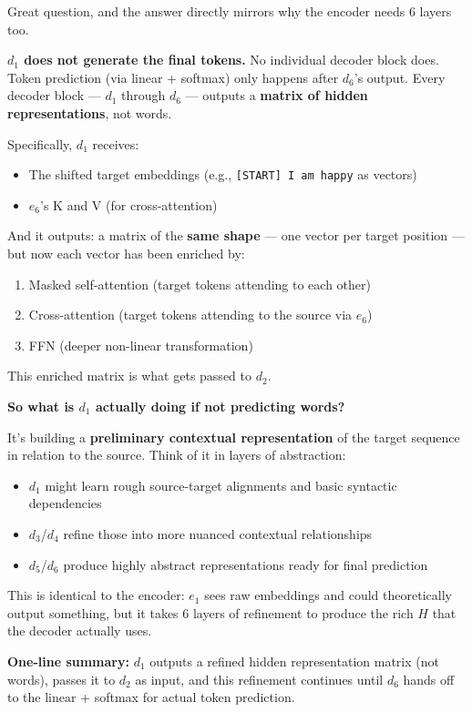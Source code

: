 \medskip

Great question, and the answer directly mirrors why the encoder needs 6 layers too.

\bigskip

\textbf{$d_1$ does not generate the final tokens.} No individual decoder block does. Token prediction (via linear + softmax) only happens after $d_6$'s output. Every decoder block --- $d_1$ through $d_6$ --- outputs a \textbf{matrix of hidden representations}, not words.

Specifically, $d_1$ receives:
\begin{itemize}
    \item The shifted target embeddings (e.g., \texttt{[START] I am happy} as vectors)
    \item $e_6$'s K and V (for cross-attention)
\end{itemize}

And it outputs: a matrix of the \textbf{same shape} --- one vector per target position --- but now each vector has been enriched by:
\begin{enumerate}
    \item Masked self-attention (target tokens attending to each other)
    \item Cross-attention (target tokens attending to the source via $e_6$)
    \item FFN (deeper non-linear transformation)
\end{enumerate}

This enriched matrix is what gets passed to $d_2$.

\bigskip

\textbf{So what is $d_1$ actually doing if not predicting words?}

It's building a \textbf{preliminary contextual representation} of the target sequence in relation to the source. Think of it in layers of abstraction:

\begin{itemize}
    \item $d_1$ might learn rough source-target alignments and basic syntactic dependencies
    \item $d_3$/$d_4$ refine those into more nuanced contextual relationships
    \item $d_5$/$d_6$ produce highly abstract representations ready for final prediction
\end{itemize}

This is identical to the encoder: $e_1$ sees raw embeddings and could theoretically output something, but it takes 6 layers of refinement to produce the rich $H$ that the decoder actually uses.

\bigskip

\textbf{One-line summary:} $d_1$ outputs a refined hidden representation matrix (not words), passes it to $d_2$ as input, and this refinement continues until $d_6$ hands off to the linear + softmax for actual token prediction.